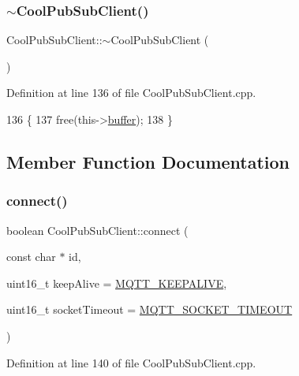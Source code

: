 \subsubsection{\texorpdfstring{$\sim$\+Cool\+Pub\+Sub\+Client()}{~CoolPubSubClient()}}
{\footnotesize\ttfamily Cool\+Pub\+Sub\+Client\+::$\sim$\+Cool\+Pub\+Sub\+Client (\begin{DoxyParamCaption}{ }\end{DoxyParamCaption})}



Definition at line 136 of file Cool\+Pub\+Sub\+Client.\+cpp.


\begin{DoxyCode}
136                                     \{
137   free(this->\hyperlink{class_cool_pub_sub_client_a7e8bcc6096626916046a51bebadc7851}{buffer});
138 \}
\end{DoxyCode}


\subsection{Member Function Documentation}
\mbox{\label{class_cool_pub_sub_client_a2664c2ebc302b2fa49f493a339ecc891}} 
\subsubsection{\texorpdfstring{connect()}{connect()}\hspace{0.1cm}{\footnotesize\ttfamily [1/4]}}
{\footnotesize\ttfamily boolean Cool\+Pub\+Sub\+Client\+::connect (\begin{DoxyParamCaption}\item[{const char $\ast$}]{id,  }\item[{uint16\+\_\+t}]{keep\+Alive = {\ttfamily \hyperlink{_cool_pub_sub_client_8h_afb4dd8c75385ab30e659314df7c2c335}{M\+Q\+T\+T\+\_\+\+K\+E\+E\+P\+A\+L\+I\+VE}},  }\item[{uint16\+\_\+t}]{socket\+Timeout = {\ttfamily \hyperlink{_cool_pub_sub_client_8h_a092cc564e4d7f03fdab6137e30a7f05b}{M\+Q\+T\+T\+\_\+\+S\+O\+C\+K\+E\+T\+\_\+\+T\+I\+M\+E\+O\+UT}} }\end{DoxyParamCaption})}



Definition at line 140 of file Cool\+Pub\+Sub\+Client.\+cpp.


